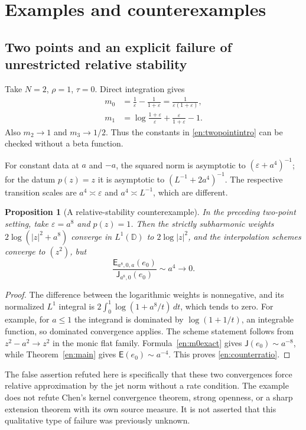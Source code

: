 \documentclass[12pt]{amsart}
\newtheorem{prop}[thm]{Proposition}
\theoremstyle{definition}
\theoremstyle{remark}
\numberwithin{equation}{section}
\newcommand{\D}{\mathbb{D}}
\newcommand{\Cost}{\mathsf E}
\newcommand{\JetCost}{\mathsf J}
\theoremstyle{definition}
\begin{document}
\section{Examples and counterexamples}
\subsection{Two points and an explicit failure of unrestricted relative stability}
Take $N=2$, $\rho=1$, $\tau=0$. Direct integration gives
\begin{align}
 m_0&=\frac1\varepsilon-\frac1{1+\varepsilon}
     =\frac1{\varepsilon(1+\varepsilon)},\label{en:m0exact}\\
 m_1&=\log\frac{1+\varepsilon}{\varepsilon}
       +\frac\varepsilon{1+\varepsilon}-1.\label{en:m1exact}
\end{align}
Also $m_2\to1$ and $m_3\to1/2$. Thus the constants in
\eqref{en:twopointintro} can be checked without a beta function.

For constant data at $a$ and $-a$, the squared norm is asymptotic to
$(\varepsilon+a^4)^{-1}$; for the datum $p(z)=z$ it is asymptotic
to $(L^{-1}+2a^4)^{-1}$. The respective transition scales are
$a^4\asymp\varepsilon$ and $a^4\asymp L^{-1}$, which are different.

\begin{prop}[A relative-stability counterexample]\label{en:counterexample}
In the preceding two-point setting, take $\varepsilon=a^8$ and
$p(z)=1$. Then the strictly subharmonic weights
$2\log(|z|^2+a^8)$ converge in $L^1(\D)$ to $2\log|z|^2$, and
the interpolation schemes converge to $(z^2)$, but
\begin{equation}\label{en:counterratio}
 \frac{\Cost_{a^8,0,a}(e_0)}{\JetCost_{a^8,0}(e_0)}
 \sim a^4\longrightarrow0.
\end{equation}
\end{prop}
\begin{proof}
The difference between the logarithmic weights is nonnegative, and
its normalized $L^1$ integral is
$2\int_0^1\log(1+a^8/t)\,dt$, which tends to zero. For example,
for $a\le1$ the integrand is dominated by
$\log(1+1/t)$, an integrable function, so dominated convergence applies.
The scheme statement follows from $z^2-a^2\to z^2$ in the monic
flat family. Formula~\eqref{en:m0exact} gives
$\JetCost(e_0)\sim a^{-8}$, while
Theorem~\ref{en:main} gives $\Cost(e_0)\sim a^{-4}$.
This proves \eqref{en:counterratio}.
\end{proof}
The false assertion refuted here is specifically that these two
convergences force relative approximation by the jet norm without a
rate condition. The example does not refute Chen's kernel convergence
theorem, strong openness, or a sharp extension theorem with its own
source measure. It is not asserted that this qualitative type of
failure was previously unknown.
\end{document}
